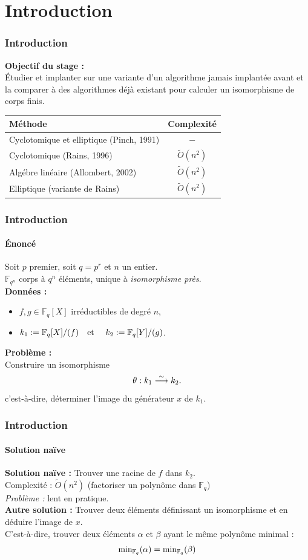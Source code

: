 \documentclass{beamer} %
\numberwithin{equation}{section}
\newcommand\GF[1]{\mathbb{F}_{#1}}
\newcommand\etmath{\textup{\quad et \quad}}
\newcommand\tO[1]{\widetilde{O}(#1)}
\begin{document}
\section{Introduction}
\begin{frame}
\frametitle{Introduction}
\textbf{Objectif du stage :}\\
Étudier et implanter sur  une variante d'un algorithme jamais
implantée avant et la comparer à des algorithmes déjà existant pour 
calculer un isomorphisme de corps finis.
\begin{table}
\centering
\begin{tabular}{|l|c|}
	\hline
	Méthode & Complexité\\
	\hline\hline
	Cyclotomique et elliptique (Pinch, 1991) & $-$\\
	\hline
	Cyclotomique (Rains, 1996) & $\tO{n^2}$\\
	\hline
	Algébre linéaire (Allombert, 2002) & $\tO{n^2}$\\
	\hline
	Elliptique (variante de Rains) & $\tO{n^2}$\\
	\hline
\end{tabular}
\end{table}
		

\end{frame}
\begin{frame}
\frametitle{Introduction}
\framesubtitle{Énoncé}
Soit $p$ premier, soit $q =p^r$ et $n$ un entier.\\
$\GF{q^n}$ \fg{} corps à $q^n$ éléments, unique à \emph{isomorphisme
près}.\\
\textbf{Données :}
\begin{itemize}
\item $f,g\in\GF{q}[X]$ irréductibles de degré $n$,
\item $k_1 := \GF{q}[X]/(f)\etmath k_2 := \GF{q}[Y]/(g)$.
\end{itemize}
\textbf{Problème :}\\
Construire un isomorphisme
\[\theta : k_1 \buildrel\sim\over\longrightarrow k_2.\]
c'est-à-dire, déterminer l'image du générateur $x$ de $k_1$.

\end{frame}
\begin{frame}
\frametitle{Introduction}
\framesubtitle{Solution naïve}
\textbf{Solution naïve :}
Trouver une racine de $f$ dans $k_2$.\\
Complexité : $\tO{n^2}$ (factoriser un polynôme dans $\GF{q}$)\\
\emph{Problème :} lent en pratique.\\
\vspace{0.3cm}
\textbf{Autre solution :}
Trouver deux éléments définissant un isomorphisme et en déduire l'image de
$x$.\\
C'est-à-dire, trouver deux éléments $\alpha$ et $\beta$ ayant le même polynôme 
minimal : 
\[\textup{min}_{\GF{q}}(\alpha) = \textup{min}_{\GF{q}}(\beta)\]
\end{frame}
\end{document}
